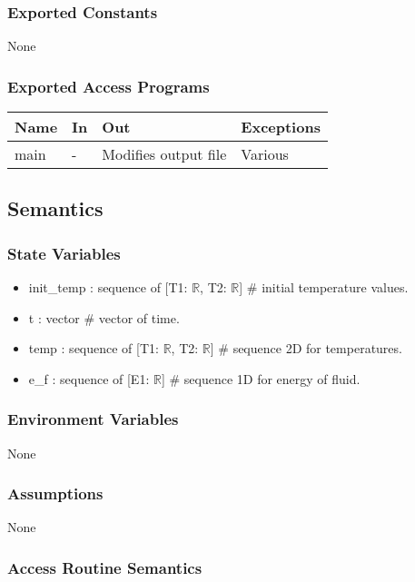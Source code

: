\documentclass[12pt, titlepage]{article}
\begin{document}
\subsubsection{Exported Constants}
None
\subsubsection{Exported Access Programs}

\begin{center}
\begin{tabular}{p{2cm} p{4cm} p{4cm} p{2cm}}
\hline
\textbf{Name} & \textbf{In} & \textbf{Out} & \textbf{Exceptions} \\
\hline
main & - & Modifies output file & Various \\
\hline
\end{tabular}
\end{center}

\subsection{Semantics}

\subsubsection{State Variables}
\begin{itemize}
    \item init\_temp : sequence of [T1: $\mathbb{R}$, T2: $ \mathbb{R}$]            \# initial temperature values.  
    \item t : vector        \# vector of time. 
    \item temp : sequence of [T1: $\mathbb{R}$, T2: $\mathbb{R}$]   \# sequence 2D for temperatures. 
    \item e\_f : sequence of [E1: $ \mathbb{R}$] \# sequence 1D for energy of fluid. 
\end{itemize}

\subsubsection{Environment Variables}

None

\subsubsection{Assumptions}

None

\subsubsection{Access Routine Semantics}
\end{document}
